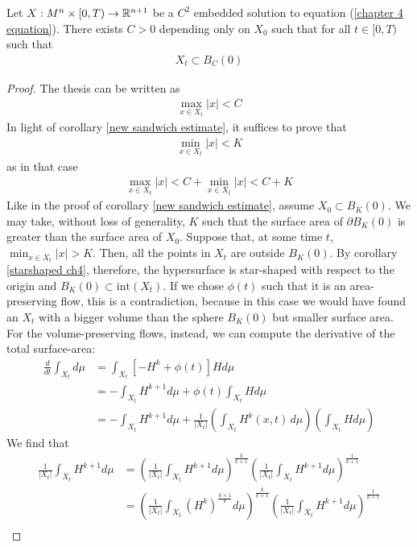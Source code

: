 \begin{proposition}
	Let $X:M^n\times [0,T) \rightarrow \mathbb{R}^{n+1}$ be a $C^2$ embedded solution to equation (\ref{chapter 4 equation}). There exists $C>0$ depending only on $X_0$ such that for all $t\in[0, T)$ such that 
	\begin{align*}
		X_t \subset B_C(0)
	\end{align*}
\end{proposition}
\begin{proof}
	The thesis can be written as 
	\begin{align*}
		\max_{x\in X_t} |x| < C
	\end{align*}
	In light of corollary \ref{new sandwich estimate}, it suffices to prove that 
	\begin{align*}
		\min_{x\in X_t} |x| < K
	\end{align*}
	as in that case 
	\begin{align*}
		\max_{x\in X_t} |x| < C + \min_{x\in X_t} |x| < C+K
	\end{align*}
	Like in the proof of corollary \ref{new sandwich estimate}, assume $X_0\subset B_K(0)$. We may take, without loss of generality, $K$ such that the surface area of $\partial B_K(0)$ is greater than the surface area of $X_0$. 
	Suppose that, at some time $t$, $\min_{x\in X_t} |x| > K$. Then, all the points in $X_t$ are outside $B_K(0)$.  By corollary \ref{starshaped ch4}, therefore, the hypersurface is star-shaped with respect to the origin and $B_K(0)\subset \mathrm{int}(X_t)$. If we chose $\phi(t)$ such that it is an area-preserving flow, this is a contradiction, because in this case we would have found an $X_t$ with a bigger volume than the sphere $B_K(0)$ but smaller surface area. For the volume-preserving flows, instead, we can compute the derivative of the total surface-area: 
	\begin{align*}
		\frac{d}{d t}\int_{X_t} d\mu &=  \int_{X_t}  \left[- H^k + \phi(t)\right] H d\mu \\
		&= - \int_{X_t}  H^{k+1} d\mu  + \phi(t)\int_{X_t} H d\mu\\
		&= - \int_{X_t}  H^{k+1} d\mu  + \frac{1}{|X_t|}\left(\int_{X_t} H^k(x, t) \, d\mu\right)\left(\int_{X_t} H d\mu\right)
	\end{align*}
	We find that 
	\begin{align*}
		\frac{1}{|X_t|}\int_{X_t}  H^{k+1} d\mu &=\left(\frac{1}{|X_t|}\int_{X_t}  H^{k+1} d\mu\right)^{\frac{k}{k+1}}\left(\frac{1}{|X_t|}\int_{X_t}  H^{k+1} d\mu\right)^{\frac{1}{k+1}}\\ &=\left(\frac{1}{|X_t|}\int_{X_t}  \left(H^{k}\right)^{\frac{k+1}{k}} d\mu\right)^{\frac{k}{k+1}}  \left(\frac{1}{|X_t|}\int_{X_t}  H^{k+1} d\mu\right)^{\frac{1}{k+1}}\\

\end{align*}
\end{proof}
